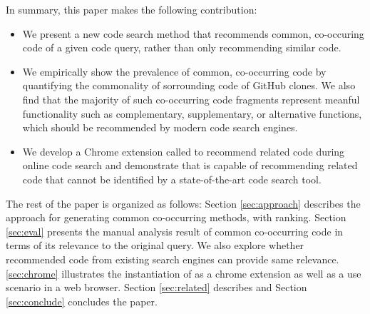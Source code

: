 In summary, this paper makes the following contribution:
\begin{itemize}
\item We present a new code search method that recommends common, co-occuring code of a given code query, rather than only recommending similar code.
\item We empirically show the prevalence of common, co-occurring code by quantifying the commonality of sorrounding code of GitHub clones. We also find that the majority of such co-occurring code fragments represent meanful functionality such as complementary, supplementary, or alternative functions, which should be recommended by modern code search engines.
\item We develop a Chrome extension called {\tool} to recommend related code during online code search and demonstrate that {\tool} is capable of recommending related code that cannot be identified by a state-of-the-art code search tool.
\end{itemize}

The rest of the paper is organized as follows: Section
\ref{sec:approach} describes the approach for generating
common co-occurring methods, with ranking. Section \ref{sec:eval} presents the manual analysis result of common co-occurring code in terms of its relevance to the original query. We also explore whether recommended code from  existing search engines can provide same relevance. \ref{sec:chrome} illustrates the instantiation of {\tool} as a chrome extension as well as a use scenario in a web browser. Section \ref{sec:related} describes and Section \ref{sec:conclude} concludes the paper.
